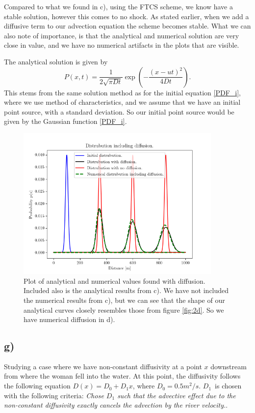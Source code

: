 \documentclass[10pt, a4paper]{amsart}
\begin{document}
Compared to what we found in c), using the FTCS scheme, we know have a stable solution, however this comes to no shock. As stated earlier, when we add a diffusive term to our advection equation the scheme becomes stable. What we can also note of importance, is that the analytical and numerical solution are very close in value, and we have no numerical artifacts in the plots that are visible. 

The analytical solution is given by 
\begin{equation}
	P(x,t) = \frac{1}{2\sqrt{\pi Dt}}\exp\left(-\frac{\left(x-ut\right)^2}{4Dt}\right).
\end{equation}
This stems from the same solution method as for the initial equation \ref{PDF_i}, where we use method of characteristics, and we assume that we have an initial point source, with a standard deviation. So our initial point source would be given by the Gaussian function \ref{PDF_i}. 
\begin{figure}
	\centering
	\includegraphics[width=0.9\textwidth]{../code/2e.png}
	\caption{Plot of analytical and numerical values found with diffusion. Included also is the analytical results from c). We have not included the numerical results from c), but we can see that the shape of our analytical curves closely resembles those from figure \ref{fig:2d}. So we have numerical diffusion in d).}
	\label{fig:2e}
\end{figure}

\subsection{g)}
Studying a case where we have non-constant diffusivity at a point $x$ downstream from where the woman fell into the water. At this point, the diffusivity follows the following equation $D(x) = D_0 + D_1x$, where $D_0 = 0.5m^2/s$. $D_1$ is chosen with the following criteria: \textit{Chose $D_1$ such that the advective effect due to the non-constant diffusivity exactly cancels the advection by the river velocity.}. 
\end{document}
